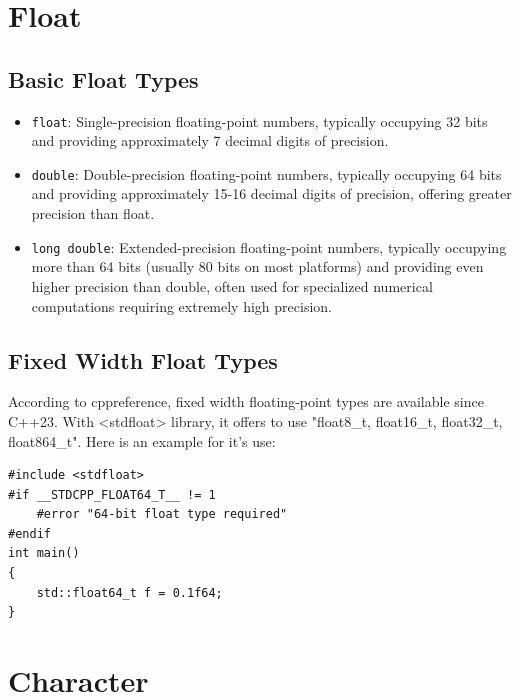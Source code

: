 \documentclass[12pt]{article}
\begin{document}
\section{Float}
\subsection{Basic Float Types}
\begin{itemize}
    \item \texttt{float}: Single-precision floating-point numbers, typically occupying 32 bits and providing approximately 7 decimal digits of precision.
    \item \texttt{double}: Double-precision floating-point numbers, typically occupying 64 bits and providing approximately 15-16 decimal digits of precision, offering greater precision than float.
    \item \texttt{long double}: Extended-precision floating-point numbers, typically occupying more than 64 bits (usually 80 bits on most platforms) and providing even higher precision than double, often used for specialized numerical computations requiring extremely high precision.
\end{itemize}
\subsection{Fixed Width Float Types}
    According to cppreference, fixed width floating-point types are available since C++23. With <stdfloat> library, it offers to use "float8\_t, float16\_t, float32\_t, float864\_t". Here is an example for it's use:
    \begin{lstlisting}
#include <stdfloat>
#if __STDCPP_FLOAT64_T__ != 1
    #error "64-bit float type required"
#endif
int main()
{
    std::float64_t f = 0.1f64;
}
    \end{lstlisting}
\section{Character}
\end{document}
